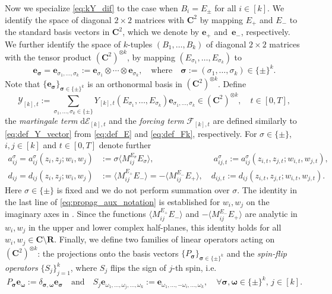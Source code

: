 \documentclass[10pt]{amsart}
\numberwithin{equation}{section}
\newcommand{\dif}{\mathrm{d}}
\newcommand{\R}{\mathbf{R}}
\newcommand{\C}{\mathbf{C}}
\begin{document}
Now we specialize \eqref{eq:kY_dif} to the case when $B_i=E_\pm$ for all $i\in [k]$. We identify the space of diagonal $2\times 2$ matrices with $\C^2$ by mapping $E_+$ and $E_-$ to the standard basis vectors in $\C^2$, which we denote by $\bm{e}_+$ and~$\bm{e}_-$, respectively. We further identify the space of $k$-tuples $(B_1,\ldots, B_k)$ of diagonal $2\times 2$ matrices with the tensor product $(\C^2)^{\otimes k}$, by mapping $(E_{\sigma_1},\ldots,E_{\sigma_k})$ to
\begin{equation}
\bm{e}_{\bm{\sigma}}=\bm{e}_{\sigma_1,\ldots,\sigma_k}:=\bm{e}_{\sigma_1}\otimes \cdots \otimes \bm{e}_{\sigma_k},\quad \text{where}\quad \bm{\sigma}:=(\sigma_1,\ldots,\sigma_k)\in\{\pm\}^k.
\end{equation}
Note that $\{\bm{e}_{\bm{\sigma}}\}_{\bm{\sigma}\in\{\pm\}^k}$ is an orthonormal basis in $(\C^2)^{\otimes k}$. Define
\begin{equation}
\mathcal{Y}_{[k],t}:=\sum_{\sigma_1,\ldots, \sigma_k\in\{\pm\}} Y_{[k],t}(E_{\sigma_1},\ldots, E_{\sigma_k})\bm{e}_{\sigma_1,\ldots,\sigma_k}\in (\C^2)^{\otimes k},\quad t\in [0,T],
\label{eq:def_Y_vector}
\end{equation}
the \emph{martingale term} $\dif \mathcal{E}_{[k],t}$ and the \emph{forcing term} $\mathcal{F}_{[k],t}$ are defined similarly to \eqref{eq:def_Y_vector} from \eqref{eq:def_E} and \eqref{eq:def_Fk}, respectively. For $\sigma\in\{\pm\}$, $i,j\in[k]$ and $t\in [0,T]$ denote further
\begin{equation}
\begin{split}
a_{ij}^{\sigma}=a_{ij}^{\sigma}(z_i,z_j;w_i,w_j)&:=\sigma \langle M_{ij}^{E_\sigma}E_\sigma\rangle,\quad\qquad\qquad\quad\,\,\,\,\,\,\, a_{ij,t}^\sigma:=a^\sigma_{ij} (z_{i,t},z_{j,t};w_{i,t},w_{j,t}),\\
d_{ij}=d_{ij}(z_i,z_j;w_i,w_j)&:=\langle M_{ij}^{E_+}E_-\rangle = -\langle M_{ij}^{E_-}E_+\rangle, \quad d_{ij,t}:=d_{ij}(z_{i,t},z_{j,t};w_{i,t},w_{j,t}).
\label{eq:propag_aux_notation}
\end{split}
\end{equation}
Here $\sigma\in\{\pm\}$ is fixed and we do not perform summation over $\sigma$. The identity in the last line of \eqref{eq:propag_aux_notation} is established for $w_i, w_j$ on the imaginary axes in \cite[Eq.(5.26)]{univ_extr}. Since the functions $\langle M_{ij}^{E_+}E_-\rangle$ and $-\langle M_{ij}^{E_-}E_+\rangle$ are analytic in $w_i,w_j$ in the upper and lower complex half-planes, this identity holds for all $w_i,w_j\in\C\setminus\R$. Finally, we define two families of linear operators acting on $(\C^2)^{\otimes k}$: the projections onto the basis vectors $\{P_{\bm{\sigma}}\}_{\bm{\sigma}\in \{\pm\}^k}$ and the \emph{spin-flip operators} $\{S_j\}_{j=1}^k$, where $S_j$ flips the sign of $j$-th spin, i.e.
\begin{equation}
P_{\bm{\sigma}}\bm{e}_{\bm{\omega}}:=\delta_{\bm{\sigma},\bm{\omega}}\bm{e}_{\bm{\sigma}}\quad\text{and}\quad S_j \bm{e}_{\omega_1,\ldots,\omega_j,\ldots,\omega_k} := \bm{e}_{\omega_1,\ldots,-\omega_i,\ldots,\omega_k},\quad \forall \bm{\sigma},\bm{\omega}\in \{\pm\}^k,\, j\in [k]. 
\end{equation} 
\end{document}
